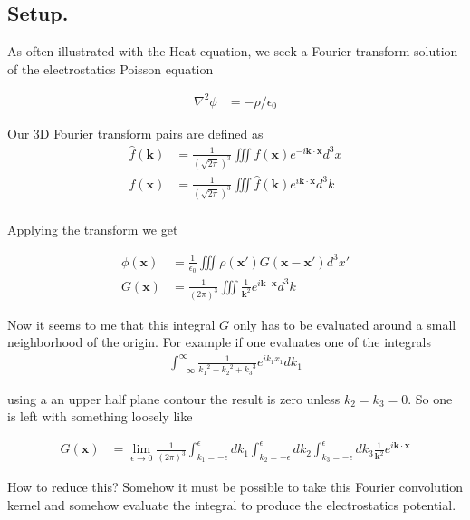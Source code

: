 \subsection{Setup. }

As often illustrated with the Heat equation, we seek a Fourier transform solution of the electrostatics Poisson equation

\begin{align}
\nabla^2 \phi &= -\rho/\epsilon_0
\end{align}

Our 3D Fourier transform pairs are defined as
\begin{align*}
\hat{f}(\mathbf{k}) &= \frac{1}{(\sqrt{2\pi})^3} \iiint f(\mathbf{x}) e^{-i \mathbf{k} \cdot \mathbf{x} } d^3 x \\
{f}(\mathbf{x}) &= \frac{1}{(\sqrt{2\pi})^3} \iiint \hat{f}(\mathbf{k}) e^{i \mathbf{k} \cdot \mathbf{x} } d^3 k \\
\end{align*}

Applying the transform we get

\begin{align}\label{eqn:poisson:poissonSolution}
\phi(\mathbf{x}) &= \frac{1}{\epsilon_0} \iiint \rho(\mathbf{x}') G(\mathbf{x-x'}) d^3 x' \\
G(\mathbf{x}) &= \frac{1}{(2 \pi)^3} \iiint \frac{1}{\mathbf{k}^2} e^{ i \mathbf{k} \cdot \mathbf{x} } d^3 k
\end{align}

Now it seems to me that this integral $G$ only has to be evaluated around a small neighborhood of the origin.  For example if one evaluates one of
the
integrals
\begin{align*}
\int_{-\infty}^\infty \frac{1}{{k_1}^2 + {k_2}^2 + {k_3}^3 } e^{ i k_1 x_1 } dk_1
\end{align*}

using a an upper half plane contour the result is zero unless $k_2 = k_3 = 0$.  So one is left with something loosely like

\begin{align*}
G(\mathbf{x}) &= \lim_{\epsilon \rightarrow 0} \frac{1}{(2 \pi)^3}
\int_{k_1 = -\epsilon}^{\epsilon} dk_1
\int_{k_2 = -\epsilon}^{\epsilon} dk_2
\int_{k_3 = -\epsilon}^{\epsilon} dk_3
 \frac{1}{\mathbf{k}^2} e^{ i \mathbf{k} \cdot \mathbf{x} }
\end{align*}

How to reduce this?  Somehow it must be possible to take this Fourier convolution kernel and somehow evaluate the integral to produce the
electrostatics potential.

